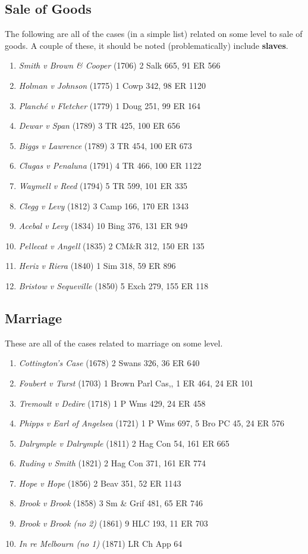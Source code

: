 \documentclass[twoside]{article}
\begin{document}
\subsection{Sale of Goods}

The following are all of the cases (in a simple list) related on some level to sale of goods. A couple of these, it should be noted (problematically) include \textbf{slaves}.
\\ 
\begin{enumerate}
\item{\textit{Smith v Brown \& Cooper} (1706) 2 Salk 665, 91 ER 566}
\item{\textit{Holman v Johnson} (1775) 1 Cowp 342, 98 ER 1120}
\item{\textit{Planché v Fletcher} (1779) 1 Doug 251, 99 ER 164}
\item{\textit{Dewar v Span} (1789) 3 TR 425, 100 ER 656}
\item{\textit{Biggs v Lawrence} (1789) 3 TR 454, 100 ER 673}
\item{\textit{Clugas v Penaluna} (1791) 4 TR 466, 100 ER 1122}
\item{\textit{Waymell v Reed} (1794) 5 TR 599, 101 ER 335}
\item{\textit{Clegg v Levy} (1812) 3 Camp 166, 170 ER 1343}
\item{\textit{Acebal v Levy} (1834) 10 Bing 376, 131 ER 949}
\item{\textit{Pellecat v Angell} (1835) 2 CM\&R 312, 150 ER 135}
\item{\textit{Heriz v Riera} (1840) 1 Sim 318, 59 ER 896}
\item{\textit{Bristow v Sequeville} (1850) 5 Exch 279, 155 ER 118}
\end{enumerate}
\subsection{Marriage}

These are all of the cases related to marriage on some level.
\\ 
\begin{enumerate}
\item{\textit{Cottington’s Case} (1678) 2 Swans 326, 36 ER 640}
\item{\textit{Foubert v Turst} (1703) 1 Brown Parl Cas,, 1 ER 464,  24 ER 101}
\item{\textit{Tremoult v Dedire} (1718) 1 P Wms 429, 24 ER 458}
\item{\textit{Phipps v Earl of Angelsea} (1721) 1 P Wms 697, 5 Bro PC 45, 24 ER 576}
\item{\textit{Dalrymple v Dalrymple} (1811) 2 Hag Con 54, 161 ER 665}
\item{\textit{Ruding v Smith} (1821) 2 Hag Con 371, 161 ER 774}
\item{\textit{Hope v Hope} (1856) 2 Beav 351, 52 ER 1143}
\item{\textit{Brook v Brook} (1858) 3 Sm \& Grif 481, 65 ER 746}
\item{\textit{Brook v Brook (no 2)} (1861) 9 HLC 193, 11 ER 703}
\item{\textit{In re Melbourn (no 1)} (1871) LR Ch App 64}
\end{enumerate}
\end{document}
